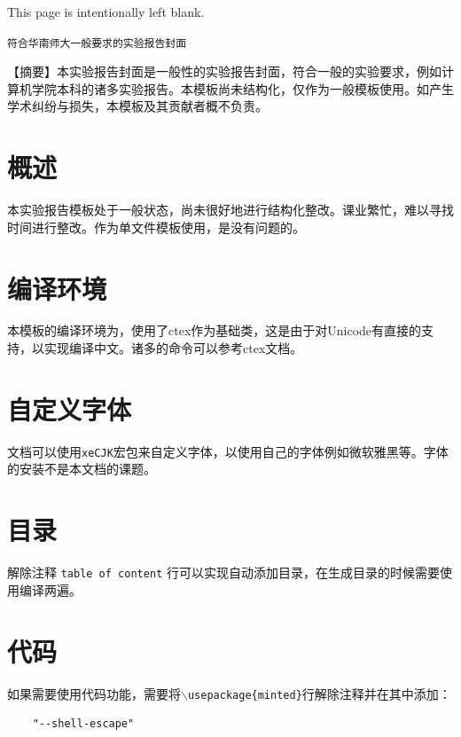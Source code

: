 \documentclass[10.5pt,a4paper,headings]{ctexart}
\newcommand*{\blankpage}{%
\vspace*{\fill}
{\centering\fontsize{32pt}{64pt} This page is intentionally left blank.\par}
\vspace{\fill}}
\begin{document}
\blankpage
\newpage
\tableofcontents

\newpage

\begin{center}
\tt 符合华南师大一般要求的实验报告封面
\end{center}

\setlength{\parindent}{2em}


\onehalfspacing
【摘要】本实验报告封面是一般性的实验报告封面，符合一般的实验要求，例如计算机学院本科的诸多实验报告。本模板尚未结构化，仅作为一般模板使用。如产生学术纠纷与损失，本模板及其贡献者概不负责。

\doublespacing
\section{概述}
本实验报告模板处于一般状态，尚未很好地进行结构化整改。课业繁忙，难以寻找时间进行整改。作为单文件模板使用，是没有问题的。

\section{编译环境}
本模板的编译环境为\XeLaTeX ，使用了ctex作为基础类，这是由于\XeLaTeX 对Unicode有直接的支持，以实现编译中文。诸多的命令可以参考ctex文档。

\section{自定义字体}
文档可以使用\texttt{xeCJK}宏包来自定义字体，以使用自己的字体例如微软雅黑等。字体的安装不是本文档的课题。

\section{目录}
解除注释 \texttt{table of content} 行可以实现自动添加目录，在生成目录的时候需要使用\XeLaTeX 编译两遍。

\section{代码}
如果需要使用代码功能，需要将\texttt{$\backslash$usepackage\{minted\}}行解除注释并在其中添加：
\begin{verbatim}
    "--shell-escape"
\end{verbatim}
\end{document}
